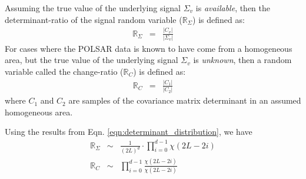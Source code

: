 \documentclass[journal]{IEEEtran}
\begin{document}
Assuming the true value of the underlying signal $\Sigma_v$ is \textit{available},
then the determinant-ratio of the signal random variable ($\mathbb{R}_{\Sigma}$) %
  is defined as:
\begin{eqnarray}
  \mathbb{R}_{\Sigma} &=& \frac{|C_v|}{|\Sigma_v|} \label{eqn:determinant_ratio_observables}%
\end{eqnarray}
For cases where the POLSAR data is known to have come from a homogeneous area, but the true value of the underlying signal $\Sigma_v$ is \textit{unknown},
 then a random variable called the change-ratio ($\mathbb{R}_{C}$)  is defined as:
\begin{eqnarray}
  \mathbb{R}_{C} &=& \frac{|C_1|}{|C_2|} \label{eqn:determinant_ratio_samples_observables}%
\end{eqnarray}
where $C_1$ and $C_2$ are samples of the covariance matrix determinant in an assumed homogeneous area. 


Using the results from Eqn. \ref{eqn:determinant_distribution}, %
  we have
\begin{eqnarray}
\mathbb{R}_{\Sigma} &\sim& \frac{1}{(2L)^d} \cdot \prod_{i=0}^{d-1} \chi (2L-2i) \label{eqn:determinant_ratio_distribution} \\
\mathbb{R}_{C} &\sim& \prod_{i=0}^{d-1} \frac{\chi(2L-2i)}{\chi(2L-2i)} \label{eqn:change_ratio_distribution}
\end{eqnarray}
\end{document}
